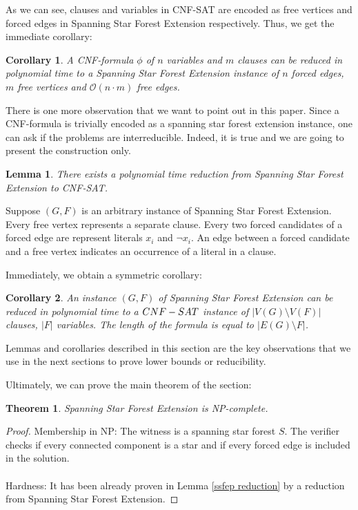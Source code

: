 \documentclass[en]{pracamgr}
\newtheorem{theorem}{Theorem}
\newtheorem{lemma}{Lemma}
\newtheorem{corollary}{Corollary}
\newenvironment{sproof}{%
	\renewcommand{\proofname}{Proof (sketch).}\proof}{\endproof}
\newcommand{\ssfep}{{\sc Spanning Star Forest Extension}}
\newcommand{\cnfsat}{{\sc CNF-SAT}}
\begin{document}
As we can see, clauses and variables in \cnfsat{} are encoded as free vertices and forced edges in \ssfep{} respectively. Thus, we get the immediate corollary:

\begin{corollary}\label{ssfep size}
	A CNF-formula $\phi$ of $n$ variables and $m$ clauses can be reduced in polynomial time to a \ssfep{} instance of $n$ forced edges, $m$ free vertices and $\mathcal{O}(n\cdot m)$ free edges.
\end{corollary}

There is one more observation that we want to point out in this paper. Since a CNF-formula is trivially encoded as a spanning star forest extension instance, one can ask if the problems are interreducible. Indeed, it is true and we are going to present the construction only.

\begin{lemma}\label{cnfsat reduction}
	There exists a polynomial time reduction from \ssfep{} to \cnfsat{}.
\end{lemma}

\begin{sproof}
	Suppose $(G,F)$ is an arbitrary instance of \ssfep{}. Every free vertex represents a separate clause. Every two forced candidates of a forced edge are represent literals $x_i$ and $\neg x_i$. An edge between a forced candidate and a free vertex indicates an occurrence of a literal in a clause.
\end{sproof}

Immediately, we obtain a symmetric corollary:

\begin{corollary}
	An instance $(G,F)$ of \ssfep{} can be reduced in polynomial time to a $\cnfsat{}$ instance of $|V(G) \setminus V(F)|$ clauses, $|F|$ variables. The length of the formula is equal to $|E(G) \setminus F|$.
\end{corollary}

Lemmas and corollaries described in this section are the key observations that we use in the next sections to prove lower bounds or reducibility.

Ultimately, we can prove the main theorem of the section:
\begin{theorem}
	\ssfep{} is NP-complete.
\end{theorem}

\begin{proof}
	Membership in NP: The witness is a spanning star forest $S$. The verifier checks if every connected component is a star and if every forced edge is included in the solution.
	\\\\
	Hardness: It has been already proven in Lemma \ref{ssfep reduction} by a reduction from \ssfep{}.
\end{proof}
\end{document}
